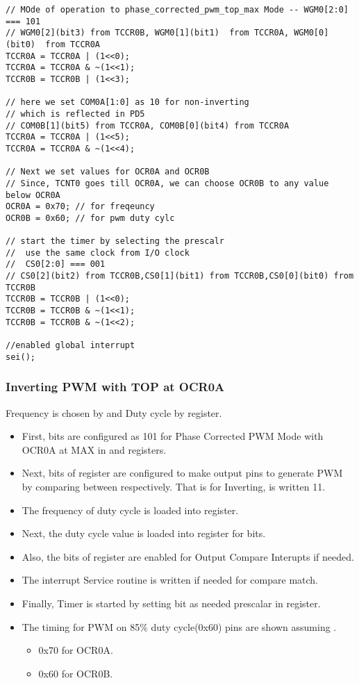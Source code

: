 \begin{verbatim}
// MOde of operation to phase_corrected_pwm_top_max Mode -- WGM0[2:0] === 101
// WGM0[2](bit3) from TCCR0B, WGM0[1](bit1)  from TCCR0A, WGM0[0](bit0)  from TCCR0A
TCCR0A = TCCR0A | (1<<0);
TCCR0A = TCCR0A & ~(1<<1);
TCCR0B = TCCR0B | (1<<3);		

// here we set COM0A[1:0] as 10 for non-inverting
// which is reflected in PD5
// COM0B[1](bit5) from TCCR0A, COM0B[0](bit4) from TCCR0A
TCCR0A = TCCR0A | (1<<5);
TCCR0A = TCCR0A & ~(1<<4);
    
// Next we set values for OCR0A and OCR0B
// Since, TCNT0 goes till OCR0A, we can choose OCR0B to any value below OCR0A
OCR0A = 0x70; // for freqeuncy
OCR0B = 0x60; // for pwm duty cylc

// start the timer by selecting the prescalr
//  use the same clock from I/O clock
//  CS0[2:0] === 001
// CS0[2](bit2) from TCCR0B,CS0[1](bit1) from TCCR0B,CS0[0](bit0) from TCCR0B
TCCR0B = TCCR0B | (1<<0);
TCCR0B = TCCR0B & ~(1<<1);
TCCR0B = TCCR0B & ~(1<<2);

//enabled global interrupt
sei();
\end{verbatim}

\subsubsection{Inverting PWM with TOP at  OCR0A}
\quad Frequency is chosen by  and Duty cycle by  register.
\begin{itemize}
    \item First,  bits are configured as 101 for Phase Corrected PWM Mode with OCR0A at MAX in  and  registers.
    \item Next,   bits of  register are configured to make output  pins to generate PWM by comparing between  respectively. That is for Inverting,  is written 11.
    \item The frequency of duty cycle is loaded into  register.
    \item Next, the duty cycle value is loaded into  register for  bits.
    \item Also, the  bits of  register  are enabled for Output Compare Interupts if needed.
    \item The interrupt Service routine is written if needed for compare match.
    \item Finally, Timer is started by setting  bit as needed prescalar in  register.
    \item The timing for PWM on 85\% duty cycle(0x60)   pins are shown assuming .
    \begin{itemize}
        \item 0x70 for OCR0A.
        \item 0x60 for OCR0B.
    \end{itemize}
\end{itemize}

